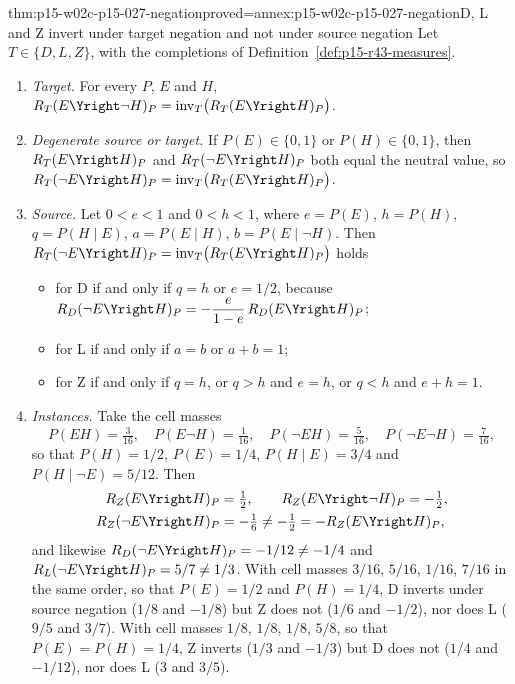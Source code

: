 \begin{hbtheorem}{thm:p15-w02c-p15-027-negation}{proved=annex:p15-w02c-p15-027-negation}{D, L and Z invert under target negation and not under source negation}
Let \(T\in\{D,L,Z\}\), with the completions of
Definition~\ref{def:p15-r43-measures}.
\begin{enumerate}
\item \emph{Target.} For every \(P\), \(E\) and \(H\),
  \(R_T(E\Yright\neg H)_P=\mathrm{inv}_T\bigl(R_T(E\Yright H)_P\bigr)\).
\item \emph{Degenerate source or target.} If \(P(E)\in\{0,1\}\) or
  \(P(H)\in\{0,1\}\), then \(R_T(E\Yright H)_P\) and
  \(R_T(\neg E\Yright H)_P\) both equal the neutral value, so
  \(R_T(\neg E\Yright H)_P=\mathrm{inv}_T\bigl(R_T(E\Yright H)_P\bigr)\).
\item \emph{Source.} Let \(0<e<1\) and \(0<h<1\), where \(e=P(E)\),
  \(h=P(H)\), \(q=P(H\mid E)\), \(a=P(E\mid H)\), \(b=P(E\mid\neg H)\).
  Then \(R_T(\neg E\Yright H)_P=\mathrm{inv}_T\bigl(R_T(E\Yright H)_P\bigr)\)
  holds
  \begin{itemize}
  \item for D if and only if \(q=h\) or \(e=1/2\), because
    \(R_D(\neg E\Yright H)_P=-\dfrac{e}{1-e}\,R_D(E\Yright H)_P\);
  \item for L if and only if \(a=b\) or \(a+b=1\);
  \item for Z if and only if \(q=h\), or \(q>h\) and \(e=h\), or
    \(q<h\) and \(e+h=1\).
  \end{itemize}
\item \emph{Instances.} Take the cell masses
  \[
   P(EH)=\tfrac{3}{16},\quad P(E\neg H)=\tfrac{1}{16},\quad
   P(\neg EH)=\tfrac{5}{16},\quad P(\neg E\neg H)=\tfrac{7}{16},
  \]
  so that \(P(H)=1/2\), \(P(E)=1/4\), \(P(H\mid E)=3/4\) and
  \(P(H\mid\neg E)=5/12\). Then
  \[
  \begin{aligned}
   R_Z(E\Yright H)_P&=\tfrac12,\qquad
   R_Z(E\Yright\neg H)_P=-\tfrac12,\\
   R_Z(\neg E\Yright H)_P&=-\tfrac16\neq-\tfrac12=-R_Z(E\Yright H)_P,
  \end{aligned}
  \]
  and likewise \(R_D(\neg E\Yright H)_P=-1/12\ne-1/4\) and
  \(R_L(\neg E\Yright H)_P=5/7\ne1/3\). With cell masses
  \(3/16\), \(5/16\), \(1/16\), \(7/16\) in the same order, so that
  \(P(E)=1/2\) and \(P(H)=1/4\), D inverts under source negation
  (\(1/8\) and \(-1/8\)) but Z does not (\(1/6\) and \(-1/2\)), nor
  does L (\(9/5\) and \(3/7\)). With cell masses \(1/8\), \(1/8\),
  \(1/8\), \(5/8\), so that \(P(E)=P(H)=1/4\), Z inverts (\(1/3\) and
  \(-1/3\)) but D does not (\(1/4\) and \(-1/12\)), nor does L
  (\(3\) and \(3/5\)).
\end{enumerate}
\end{hbtheorem}

